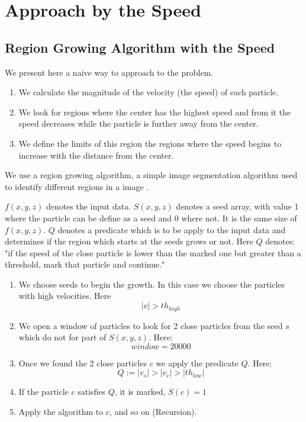 \documentclass[12pt]{article}
\begin{document}



\appendix
\section{Approach by the Speed} \label{App:App_Speed}
\subsection{Region Growing Algorithm with the Speed}

We present here a naive way to approach to the problem. 
\begin{enumerate}
	\item We calculate the magnitude of the velocity (the speed) of each particle. 
	\item We look for regions where the center has the highest speed and from it the speed decreases while the particle is further away from the center. 
    \item We define the limits of this region the regions where the speed begins to increase with the distance from the center.
\end{enumerate}

\begin{par}
We use a region growing algorithm, a simple image segmentation algorithm
used to identify different regions in a image \cite{gonzalez_digital_2008}.
\end{par}

\begin{par}
$f(x,y,z)$ denotes the input data. $S(x,y,z)$ denotes a seed array, with
value 1 where the particle can be define as a seed and 0 where not. It is the
same size of $f(x,y,z)$. $Q$ denotes a predicate which is to be apply to the
input data and determines if the region which
 starts at the seeds grows or
not. Here $Q$ denotes: "if the speed of the close
 particle is lower than the
marked one but greater than a threshold, mark that
 particle and continue."
\end{par}

\begin{enumerate}
	\item We choose seeds to begin the growth. In
	 this case we choose the particles with high
	  velocities. Here \[ |v|>  th_{high}\]
	\item We open a window of particles to look
	 for 2 close particles from the seed $s$ which
	  do not for part of $S(x,y,z)$. Here:
    \[ window = 20000\]
    \item Once we found the 2 close particles $c$ we apply the predicate $Q$. Here:
    \[ Q := |v_s| > |v_c| > |th_{low}|\]
    
    \item If the particle $c$ satisfies $Q$, it is
     marked, $S(c) = 1$
    \item Apply the algorithm to $c$, and so on
     (Recursion).
\end{enumerate}
\end{document}
